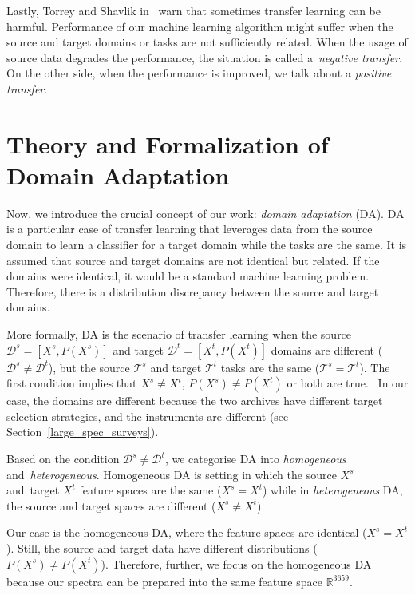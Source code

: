 Lastly, Torrey and Shavlik in~\cite{torrey2010} warn
that sometimes transfer learning can be harmful.
Performance of our machine learning algorithm might suffer
when the source and target domains or tasks are not sufficiently related.
When the usage of source data degrades the performance,
the situation is called a~\textit{negative transfer}.
On the other side, when the performance is improved,
we talk about a \textit{positive transfer}.

\section{Theory and Formalization of Domain Adaptation}

Now, we introduce the crucial concept of our work: \textit{domain adaptation} (DA).
DA is a particular case of transfer learning
that leverages data from the source domain to learn a classifier for a target domain while the tasks are the same.
It is assumed that source and target domains are not identical but related.
If the domains were identical, it would be a standard machine learning problem.
Therefore, there is a distribution discrepancy between the source and target domains.~\cite{csurka2017}

More formally, DA is the scenario of transfer learning
when the source \(\mathcal{D}^s = [X^s, P(X^s)]\)
and target \(\mathcal{D}^t = [X^t, P(X^t)]\)
domains are different (\(\mathcal{D}^s \ne \mathcal{D}^t\)),
but the source \(\mathcal{T}^s\) and target \(\mathcal{T}^t\)
tasks are the same (\(\mathcal{T}^s = \mathcal{T}^t\)).
The first condition implies
that \(X^s \ne X^t\), \(P(X^s) \ne P(X^t)\) or both are true.~\cite{pan2010}
In our case, the domains are different
because the two archives have different target selection strategies,
and the instruments are different (see Section~\ref{large_spec_surveys}).

Based on the condition \(\mathcal{D}^s \ne \mathcal{D}^t\),
we categorise DA into \textit{homogeneous} and~\textit{heterogeneous}.
Homogeneous DA is setting in which the source \(X^s\)
and~target \(X^t\) feature spaces are the same (\(X^s = X^t\))
while in \textit{heterogeneous} DA, the source and target spaces are different
(\(X^s \ne X^t\)).~\cite{csurka2017}

Our case is the homogeneous DA,
where the feature spaces are identical (\(X^s = X^t\)).
Still, the source and target data have different distributions (\(P(X^s) \ne P(X^t)\)).
Therefore, further, we focus on the homogeneous DA
because our spectra can be prepared into the same feature space \(\mathbb{R}^{3659}\).

